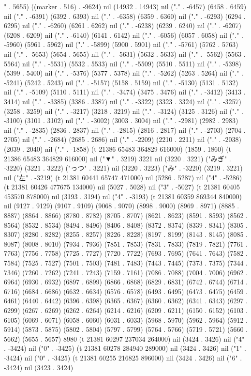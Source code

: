 " . 5655) ((marker . 516) . -9624) nil (14932 . 14943) nil ("." . -6457) (6458 . 6459) nil ("." . -6391) (6392 . 6393) nil ("." . -6358) (6359 . 6360) nil ("." . -6293) (6294 . 6295) nil ("." . -6260) (6261 . 6262) nil ("." . -6238) (6239 . 6240) nil ("." . -6207) (6208 . 6209) nil ("." . -6140) (6141 . 6142) nil ("." . -6056) (6057 . 6058) nil ("." . -5960) (5961 . 5962) nil ("." . -5899) (5900 . 5901) nil ("." . -5761) (5762 . 5763) nil ("." . -5653) (5654 . 5655) nil ("." . -5631) (5632 . 5633) nil ("." . -5562) (5563 . 5564) nil ("." . -5531) (5532 . 5533) nil ("." . -5509) (5510 . 5511) nil ("." . -5398) (5399 . 5400) nil ("." . -5376) (5377 . 5378) nil ("." . -5262) (5263 . 5264) nil ("." . -5241) (5242 . 5243) nil ("." . -5157) (5158 . 5159) nil ("." . -5130) (5131 . 5132) nil ("." . -5109) (5110 . 5111) nil ("." . -3474) (3475 . 3476) nil ("." . -3412) (3413 . 3414) nil ("." . -3385) (3386 . 3387) nil ("." . -3322) (3323 . 3324) nil ("." . -3257) (3258 . 3259) nil ("." . -3217) (3218 . 3219) nil ("." . -3124) (3125 . 3126) nil ("." . -3100) (3101 . 3102) nil ("." . -3002) (3003 . 3004) nil ("." . -2981) (2982 . 2983) nil ("." . -2835) (2836 . 2837) nil ("." . -2815) (2816 . 2817) nil ("." . -2703) (2704 . 2705) nil ("." . -2684) (2685 . 2686) nil ("." . -2209) (2210 . 2211) nil ("." . -2038) (2039 . 2040) nil ("." . -1858) (t 21386 65483 364829 616000) (1859 . 1860) (t 21386 65483 364829 616000) nil ("▼" . 3219) 3221 nil (3220 . 3221) ("みぎ" . -3220) (3221 . 3222) ("っつ" . 3221) nil (3220 . 3223) ("み" . -3220) (3219 . 3221) nil ("左" . -3219) (t 21381 60441 65747 471000) nil (5286 . 5287) nil ("4" . -5286) (t 21381 60426 477675 134000) nil (5027 . 5028) nil ("3" . -5027) (t 21381 60405 453570 878000) nil (3193 . 3194) nil ("4" . -3193) (t 21381 60359 869344 840000) nil (9127 . 9129) (9107 . 9109) (9068 . 9070) (8998 . 9000) (8969 . 8971) (8885 . 8887) (8864 . 8866) (8780 . 8782) (8705 . 8707) (8621 . 8623) (8591 . 8593) (8562 . 8564) (8532 . 8534) (8494 . 8496) (8406 . 8408) (8372 . 8374) (8339 . 8341) (8305 . 8307) (8280 . 8282) (8255 . 8257) (8226 . 8228) (8197 . 8199) (8143 . 8145) (8085 . 8087) (8008 . 8010) (7934 . 7936) (7851 . 7853) (7831 . 7833) (7819 . 7821) (7761 . 7763) (7756 . 7758) (7725 . 7727) (7720 . 7722) (7693 . 7695) (7641 . 7643) (7582 . 7584) (7525 . 7527) (7501 . 7503) (7481 . 7483) (7443 . 7445) (7373 . 7375) (7344 . 7346) (7260 . 7262) (7241 . 7243) (7159 . 7161) (7086 . 7088) (7004 . 7006) (6962 . 6964) (6930 . 6932) (6897 . 6899) (6866 . 6868) (6829 . 6831) (6742 . 6744) (6714 . 6716) (6684 . 6686) (6632 . 6634) (6576 . 6578) (6493 . 6495) (6473 . 6475) (6459 . 6461) (6440 . 6442) (6396 . 6398) (6365 . 6367) (6360 . 6362) (6341 . 6343) (6297 . 6299) (6267 . 6269) (6262 . 6264) (6214 . 6216) (6209 . 6211) (6150 . 6152) (6103 . 6105) (6069 . 6071) (6058 . 6060) (6031 . 6033) (5968 . 5970) (5962 . 5964) (5912 . 5914) (5873 . 5875) (5802 . 5804) (5797 . 5799) (5764 . 5766) (5719 . 5721) (5660 . 5662) (5655 . 5657) 8980 (t 21381 60297 237034 264000) nil (3424 . 3426) nil ("4" . -3424) nil ("0" . -3425) (t 21381 60278 284940 289000) nil (3424 . 3426) nil ("1" . -3424) nil ("0" . -3425) (t 21381 60255 216825 896000) nil (3424 . 3426) nil ("6" . -3424) nil (3423 . 3424) 